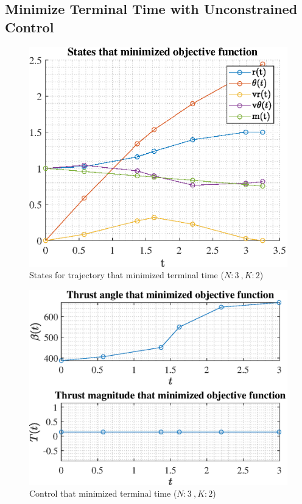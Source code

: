 \documentclass[]{article}
\begin{document}
    \subsection{Minimize Terminal Time with Unconstrained Control}
\begin{figure}
	\centering
	\includegraphics[scale=0.75]{states_N3_K2_C2_tf.eps}
	\caption{States for trajectory that minimized terminal time (\(N:3\ , K:2\))}
	\label{fig:states_N3_K2_C2_tf}
\end{figure}
\begin{figure}
	\centering
	\includegraphics[scale=0.75]{control_N3_K2_C2_tf.eps}
	\caption{Control that minimized terminal time (\(N:3\ , K:2\))}
	\label{fig:control_N3_K2_C2_tf}
\end{figure}
\end{document}
